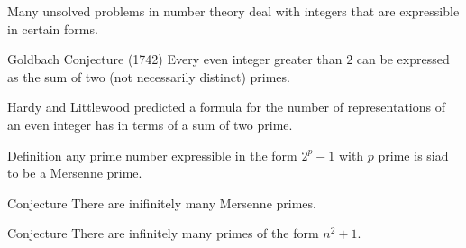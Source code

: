 Many unsolved problems in number theory deal with integers that are expressible in certain forms.
\begin{state}{Goldbach Conjecture (1742)}
    Every even integer greater than $2$ can be expressed as the 
    sum of two (not necessarily distinct) primes. 
\end{state}

Hardy and Littlewood predicted a formula for the number of 
representations of an even integer has in terms of a sum of two prime.

\begin{state}{Definition}
    any prime number expressible in the form $2^p-1$ with $p$ prime is 
    siad to be a Mersenne prime.
\end{state}

\begin{state}{Conjecture}
    There are inifinitely many Mersenne primes.
\end{state}

\begin{state}{Conjecture}
    There are infinitely many primes of the form $n^2+1$.
\end{state}
